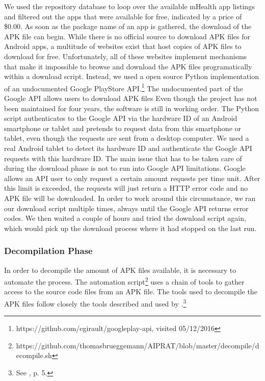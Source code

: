 We used the repository database to loop over the available mHealth app listings and filtered out the apps that were available for free, indicated by a price of \$0.00.
As soon as the package name of an app is gathered, the download of the \acs{APK} file can begin. 
While there is no official source to download \acs{APK} files for Android apps, a multitude of websites exist that host copies of \acs{APK} files to download for free.
Unfortunately, all of these websites implement mechanisms that make it impossible to browse and download the APK files programatically within a download script.
Instead, we used a open source Python implementation of an undocumented Google PlayStore \acs{API}.\footnote{https://github.com/egirault/googleplay-api, visited 05/12/2016} 
The undocumented part of the Google API allows users to download APK files 
Even though the project has not been maintained for four years, the software is still in working order.
The Python script authenticates to the Google API via the hardware ID of an Android smartphone or tablet and pretends to request data from this smartphone or tablet, even though the requests are sent from a desktop computer.
We used a real Android tablet to detect its hardware ID and authenticate the Google API requests with this hardware ID.
The main issue that has to be taken care of during the download phase is not to run into Google API limitations. 
Google allows an API user to only request a certain amount requests per time unit. 
After this limit is exceeded, the requests will just return a HTTP error code and no APK file will be downloaded.
In order to work around this circumstance, we ran our download script multiple times, always until the Google API returns error codes. 
We then waited a couple of hours and tried the download script again, which would pick up the download process where it had stopped on the last run.

\subsubsection{Decompilation Phase}

In order to decompile the amount of APK files available, it is necessary to automate the process. 
The automation script\footnote{https://github.com/thomasbrueggemann/AIPRAT/blob/master/decompile/decompile.sh} uses a chain of tools to gather access to the source code files from an APK file.
The tools used to decompile the APK files follow closely the tools described and used by \cite{Enck2011}.\footnote{See \cite{Enck2011}, p. 5.}

